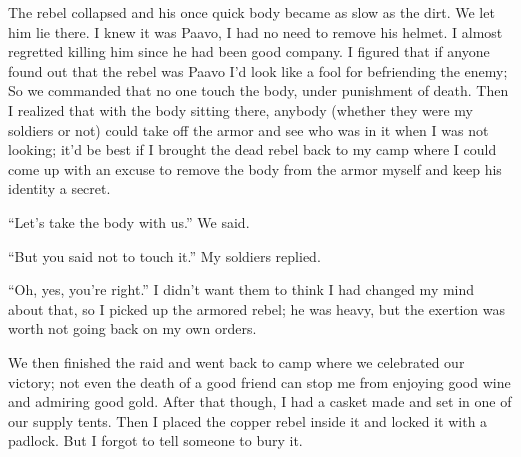 The rebel collapsed and his once quick body became as slow as the dirt. We let him lie there. I knew it was Paavo, I had no need to remove his helmet. I almost regretted killing him since he had been good company.
I figured that if anyone found out that the rebel was Paavo I'd look like a fool for befriending the enemy;
So we commanded that no one touch the body, under punishment of death. Then I realized that with the body sitting there, anybody (whether they were my soldiers or not) could take off the armor and see who was in it when I was not looking; it'd be best if I brought the dead rebel back to my camp where I could come up with an excuse to remove the body from the armor myself and keep his identity a secret.

``Let's take the body with us.'' We said.

``But you said not to touch it.'' My soldiers replied.

``Oh, yes, you're right.'' I didn't want them to think I had changed my mind about that, so I picked up the armored rebel; he was heavy, but the exertion was worth not going back on my own orders.

We then finished the raid and went back to camp where we celebrated our victory; not even the death of a good friend can stop me from enjoying good wine and admiring good gold. After that though, I had a casket made and set in one of our supply tents. Then I placed the copper rebel inside it and locked it with a padlock. But I forgot to tell someone to bury it.


